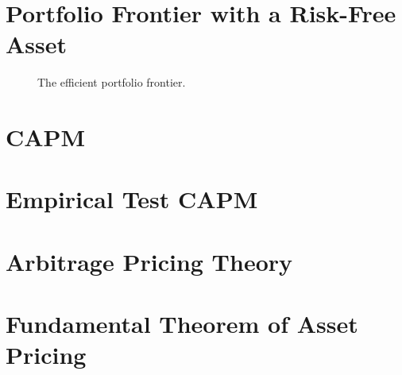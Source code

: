 \documentclass[twoside]{article}
\begin{document}
\section{Portfolio Frontier with a Risk-Free Asset}

\begin{figure}[ht]
    \centering
    \caption{The efficient portfolio frontier.}
    \label{fig:epf}
\end{figure}

\section{CAPM}

\section{Empirical Test CAPM}

\section{Arbitrage Pricing Theory}

\section{Fundamental Theorem of Asset Pricing}
\end{document}
